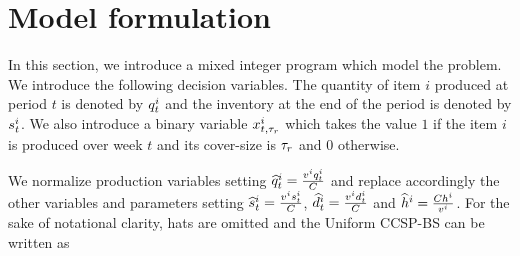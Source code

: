 \section{Model formulation}
\label{sec:pdp-cover:model-formulation}

In this section, we introduce a mixed integer program which model the problem.
We introduce the following decision variables.
The quantity of item $i$ produced at period $t$ is denoted by $q_t^i$ and the inventory at the end of the period is denoted by $s_t^i$. We also introduce a binary variable $x_{t,\tau_r}^i$ which takes the value $1$ if the item $i$ is produced over week $t$ and its cover-size is $\tau_r$ and $0$ otherwise.


We normalize production variables setting $\widehat{q}_t^i=\frac{v^iq_t^i}{C}$ and replace accordingly the other variables and parameters setting $\widehat{s}_t^i=\frac{v^is_t^i}{C}$, $\widehat{d}_t^i=\frac{v^id_t^i}{C}$ and $\widehat{h}^i=\frac{Ch^i}{v^i}$.
For the sake of notational clarity, hats are omitted and the Uniform CCSP-BS can be written as
